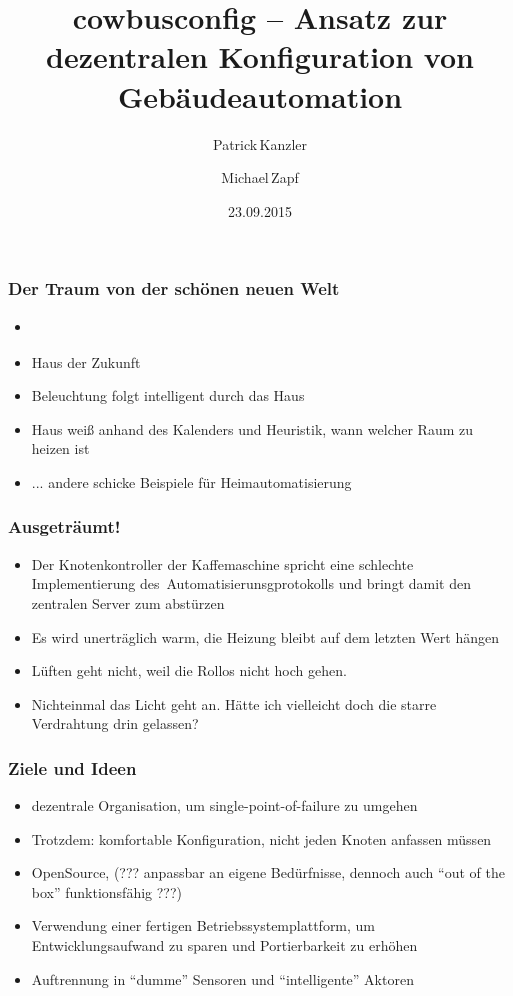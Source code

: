 \documentclass{beamer}
\title{cowbusconfig – Ansatz zur dezentralen Konfiguration von Gebäudeautomation}
\author[P. Kanzler, M. Zapf]{Patrick\,Kanzler \and Michael\,Zapf}
\date{23.09.2015}
\newcommand{\todo}[1]{\textbf{\color{red}{TODO: #1}}}
\begin{document}
\frame{\titlepage}

\begin{frame}
	\frametitle{Der Traum von der schönen neuen Welt}
	
	\begin{itemize}
		\item \todo{schön darstellen, vielleicht mit Bildern, momentan nur Stichpunkte}
		\item Haus der Zukunft
		\item Beleuchtung folgt intelligent durch das Haus
		\item Haus weiß anhand des Kalenders und Heuristik, wann welcher Raum zu heizen ist
		\item ... andere schicke Beispiele für Heimautomatisierung
	\end{itemize}
\end{frame}

\begin{frame}
	\frametitle{Ausgeträumt!}
	
	\begin{itemize}
		\item Der Knotenkontroller der Kaffemaschine spricht eine schlechte Implementierung des\
		Automatisierunsgprotokolls und bringt damit den zentralen Server zum abstürzen
		\item Es wird unerträglich warm, die Heizung bleibt auf dem letzten Wert hängen
		\item Lüften geht nicht, weil die Rollos nicht hoch gehen.
		\item Nichteinmal das Licht geht an. Hätte ich vielleicht doch die starre Verdrahtung drin gelassen?
	\end{itemize}
\end{frame}

\begin{frame}
    \frametitle{Ziele und Ideen}

    \begin{itemize}
        \item dezentrale Organisation, um single-point-of-failure zu umgehen
        \item Trotzdem: komfortable Konfiguration, nicht jeden Knoten anfassen müssen
        \item OpenSource, (??? anpassbar an eigene Bedürfnisse, dennoch auch \enquote{out of the box} funktionsfähig ???)
        \item Verwendung einer fertigen Betriebssystemplattform, um Entwicklungsaufwand zu sparen und Portierbarkeit zu erhöhen
        \item Auftrennung in \enquote{dumme} Sensoren und \enquote{intelligente} Aktoren
    \end{itemize}
\end{frame}
\end{document}
